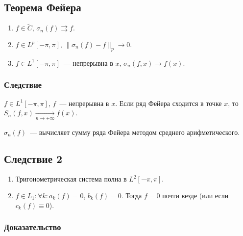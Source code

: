 \documentclass{article}
\begin{document}
    \subsection{Теорема Фейера}
    
        \begin{enumerate}
        
            \item $f \in \widetilde{C}$, $\sigma_n(f) \rightrightarrows f$.
            
            \item $f \in L^p [-\pi, \pi]$, $\| \sigma_n(f) - f \|_p \rightarrow 0$.
            
            \item $f \in L^1 [-\pi, \pi]$~--- непрерывна в $x$, $\sigma_n(f, x) \rightarrow f(x)$.
            
        \end{enumerate}
        
        \subsubsection{Следствие}
        
            $f \in L^1 [-\pi, \pi]$, $f$~--- непрерывна в $x$. Если ряд Фейера сходится в точке $x$, то $S_n(f, x) \xrightarrow[n \rightarrow +\infty]{} f(x)$.
            
            $\sigma_n(f)$~--- вычисляет сумму ряда Фейера методом среднего арифметического.
        
        \subsection{Следствие 2}
        
            \begin{enumerate}
            
                \item Тригонометрическая система полна в $L^2 [-\pi, \pi]$.
                
                \item $f \in L_1 : \forall k : a_k(f) = 0$, $b_k(f) = 0$. Тогда $f = 0$ почти везде (или если $c_k(f) \equiv 0$).
                    
            \end{enumerate}
            
                \subsubsection{Доказательство}
                
\end{document}
